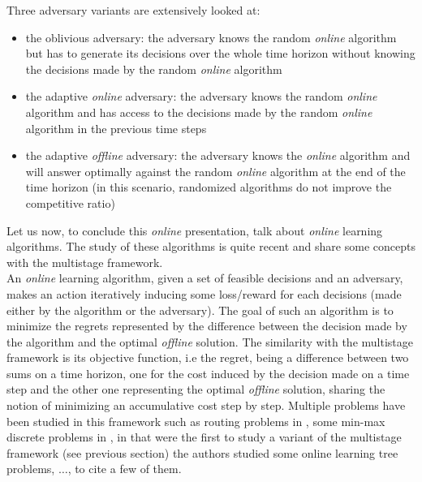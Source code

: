 \documentclass[a4paper]{book}
\begin{document}
Three adversary variants are extensively looked at:
\begin{itemize}
    \item the oblivious adversary: the adversary knows the random \emph{online} algorithm but has to generate its decisions over the whole time horizon without knowing the decisions made by the random \emph{online} algorithm 
    \item the adaptive \emph{online} adversary: the adversary knows the random \emph{online} algorithm and has access to the decisions made by the random \emph{online} algorithm in the previous time steps
    \item the adaptive \emph{offline} adversary: the adversary knows the \emph{online} algorithm and will answer optimally against the random \emph{online} algorithm at the end of the time horizon (in this scenario, randomized algorithms do not improve the competitive ratio)  
\end{itemize}
Let us now, to conclude this \emph{online} presentation, talk about \emph{online} learning algorithms. The study of these algorithms is quite recent and share some concepts with the multistage framework. \\
An \emph{online} learning algorithm, given a set of feasible decisions and an adversary, makes an action iteratively inducing some loss/reward for each decisions (made either by the algorithm or the adversary). The goal of such an algorithm is to minimize the regrets represented by the difference between the decision made by the algorithm and the optimal \emph{offline} solution. The similarity with the multistage framework is its objective function, i.e the regret, being a difference between two sums on a time horizon, one for the cost induced by the decision made on a time step and the other one representing the optimal \emph{offline} solution, sharing the notion of minimizing an accumulative cost step by step. Multiple problems have been studied in this framework such as routing problems in \cite{AwerbuchK08}, some min-max discrete problems in \cite{corr/abs-1907-05944}, in \cite{buchbinder2012unified} that were the first to study a variant of the multistage framework (see previous section) the authors studied some online learning tree problems, $\ldots$, to cite a few of them.
\end{document}
